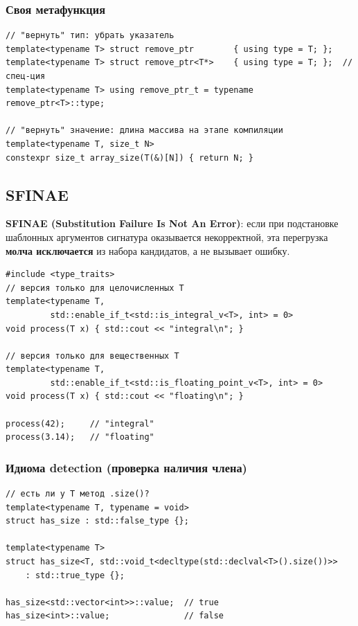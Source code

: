 \subsubsection{Своя метафункция}

\begin{lstlisting}
// "вернуть" тип: убрать указатель
template<typename T> struct remove_ptr        { using type = T; };
template<typename T> struct remove_ptr<T*>    { using type = T; };  // спец-ция
template<typename T> using remove_ptr_t = typename remove_ptr<T>::type;

// "вернуть" значение: длина массива на этапе компиляции
template<typename T, size_t N>
constexpr size_t array_size(T(&)[N]) { return N; }
\end{lstlisting}

\subsection{SFINAE}

\textbf{SFINAE (Substitution Failure Is Not An Error)}: если при подстановке
шаблонных аргументов сигнатура оказывается некорректной, эта перегрузка
\textbf{молча исключается} из набора кандидатов, а не вызывает ошибку.

\begin{lstlisting}
#include <type_traits>
// версия только для целочисленных T
template<typename T,
         std::enable_if_t<std::is_integral_v<T>, int> = 0>
void process(T x) { std::cout << "integral\n"; }

// версия только для вещественных T
template<typename T,
         std::enable_if_t<std::is_floating_point_v<T>, int> = 0>
void process(T x) { std::cout << "floating\n"; }

process(42);     // "integral"
process(3.14);   // "floating"
\end{lstlisting}

\subsubsection{Идиома detection (проверка наличия члена)}

\begin{lstlisting}
// есть ли у T метод .size()?
template<typename T, typename = void>
struct has_size : std::false_type {};

template<typename T>
struct has_size<T, std::void_t<decltype(std::declval<T>().size())>>
    : std::true_type {};

has_size<std::vector<int>>::value;  // true
has_size<int>::value;               // false
\end{lstlisting}

